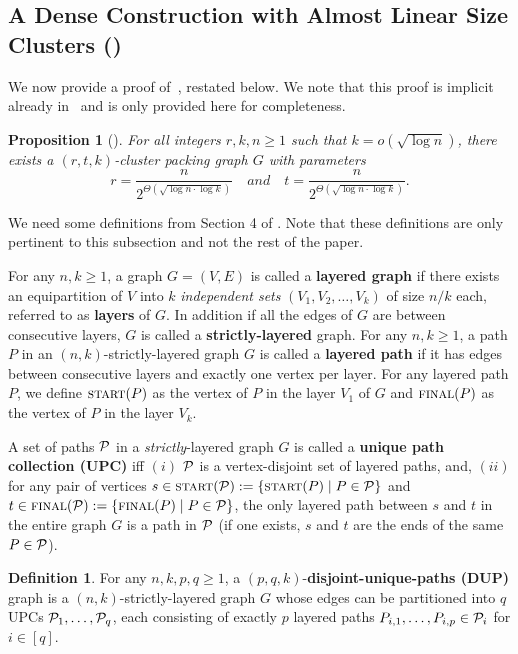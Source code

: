 \documentclass[11pt]{article}
\newtheorem*{proposition*}{Proposition}
\theoremstyle{definition}
\newtheorem{mddefinition}[lemma]{Definition}
\newenvironment{Definition}{\begin{mdframed}[hidealllines=false,innerleftmargin=10pt,backgroundcolor=white!10,innertopmargin=5pt,innerbottommargin=5pt,roundcorner=10pt]\begin{mddefinition}}{\end{mddefinition}\end{mdframed}}
\renewcommand{\geq}{\geqslant}
\newcommand{\set}[1]{\ensuremath{\left\{ #1 \right\}}}
\begin{document}
\subsection{A Dense Construction with  Almost Linear Size Clusters ()}\label{app:cpg-dense}

We now provide a proof of~, restated below. We note that this proof is implicit already in~\cite{AssadiKNS24} and is only provided here for completeness. 

\begin{proposition*}[]
	For all integers $r,k,n \geq 1$ such that $k = o(\sqrt{\log{n}})$, there exists a $(r,t,k)$-cluster packing graph $G$ with parameters 
	\[
		r = \frac{n}{2^{\Theta(\sqrt{\log{n} \cdot \log{k}})}} \quad and \quad t = \frac{n}{2^{\Theta(\sqrt{\log{n} \cdot \log{k}})}}. 
	\]
\end{proposition*}

We need some definitions from Section 4 of \cite{AssadiKNS24}. Note that these definitions are only pertinent to this subsection and not the rest of the paper.

	For any $n, k \geq 1$, a graph $G = (V, E)$ is called a \textbf{layered graph}  if there exists an equipartition of $V$ into $k$ \emph{independent sets} $(V_1, V_2, \ldots, V_k)$ of size $n/k$ each, referred to as \textbf{layers} of $G$. In addition if all the edges of $G$ are between consecutive layers, $G$ is called a \textbf{strictly-layered} graph.		
	For any $n, k \geq 1$, a path $P$ in an $(n,k)$-strictly-layered graph $G$ is called a \textbf{layered path} if it has edges between consecutive layers and exactly one vertex per layer.
	For any layered path $P$, we define $\textnormal{\textsc{start}}(P)$ as the vertex of $P$ in the layer $V_1$ of $G$ and $\textnormal{\textsc{final}}(P)$ as the vertex of $P$ in the layer $V_k$. 


A set of paths $\mathcal{P}$ in a \emph{strictly}-layered graph $G$ is called a \textbf{unique path collection (UPC)} iff $(i)$ $\mathcal{P}$ is a vertex-disjoint set of layered paths, 
	and, $(ii)$ for any pair of vertices $s \in \startvert(\cP) := \set{\startvert(P) \mid P \in \cP}$ and $t \in \finalvert(\cP) := \set{\finalvert(P) \mid P \in \cP}$, 
	the only layered path between $s$ and $t$ in the entire graph $G$ is a path in $\mathcal{P}$ (if one exists, $s$ and $t$ are the ends of the same $P \in \mathcal{P}$). 


\begin{Definition}\label{def:unique-paths}
	For any $n,k, p,q \geq 1$, a $(p,q,k)$-\textbf{disjoint-unique-paths (DUP)} graph is a $(n,k)$-strictly-layered graph $G$ whose edges can be partitioned into $q$ 
	UPCs $\mathcal{P}_1,\ldots,\mathcal{P}_q$, each consisting of exactly $p$ layered paths $P_{i,1},\ldots,P_{i,p} \in \mathcal{P}_i$ for $i \in [q]$. 
\end{Definition}
\end{document}
